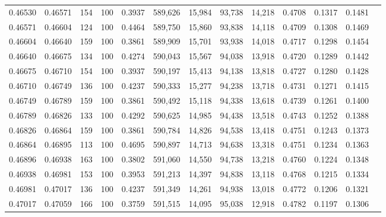 \begin{tabular}{rrrrrrrrrrrrr}
0.46530 & 0.46571 &   154 & 100 &                                     0.3937 & 589,626 &  15,984 &  93,738 &  14,218 & 0.4708 & 0.1317 & 0.1481 \\
0.46571 & 0.46604 &   124 & 100 &                                     0.4464 & 589,750 &  15,860 &  93,838 &  14,118 & 0.4709 & 0.1308 & 0.1469 \\
0.46604 & 0.46640 &   159 & 100 &                                     0.3861 & 589,909 &  15,701 &  93,938 &  14,018 & 0.4717 & 0.1298 & 0.1454 \\
0.46640 & 0.46675 &   134 & 100 &                                     0.4274 & 590,043 &  15,567 &  94,038 &  13,918 & 0.4720 & 0.1289 & 0.1442 \\
0.46675 & 0.46710 &   154 & 100 &                                     0.3937 & 590,197 &  15,413 &  94,138 &  13,818 & 0.4727 & 0.1280 & 0.1428 \\
0.46710 & 0.46749 &   136 & 100 &                                     0.4237 & 590,333 &  15,277 &  94,238 &  13,718 & 0.4731 & 0.1271 & 0.1415 \\
0.46749 & 0.46789 &   159 & 100 &                                     0.3861 & 590,492 &  15,118 &  94,338 &  13,618 & 0.4739 & 0.1261 & 0.1400 \\
0.46789 & 0.46826 &   133 & 100 &                                     0.4292 & 590,625 &  14,985 &  94,438 &  13,518 & 0.4743 & 0.1252 & 0.1388 \\
0.46826 & 0.46864 &   159 & 100 &                                     0.3861 & 590,784 &  14,826 &  94,538 &  13,418 & 0.4751 & 0.1243 & 0.1373 \\
0.46864 & 0.46895 &   113 & 100 &                                     0.4695 & 590,897 &  14,713 &  94,638 &  13,318 & 0.4751 & 0.1234 & 0.1363 \\
0.46896 & 0.46938 &   163 & 100 &                                     0.3802 & 591,060 &  14,550 &  94,738 &  13,218 & 0.4760 & 0.1224 & 0.1348 \\
0.46938 & 0.46981 &   153 & 100 &                                     0.3953 & 591,213 &  14,397 &  94,838 &  13,118 & 0.4768 & 0.1215 & 0.1334 \\
0.46981 & 0.47017 &   136 & 100 &                                     0.4237 & 591,349 &  14,261 &  94,938 &  13,018 & 0.4772 & 0.1206 & 0.1321 \\
0.47017 & 0.47059 &   166 & 100 &                                     0.3759 & 591,515 &  14,095 &  95,038 &  12,918 & 0.4782 & 0.1197 & 0.1306 \\

\end{tabular}

